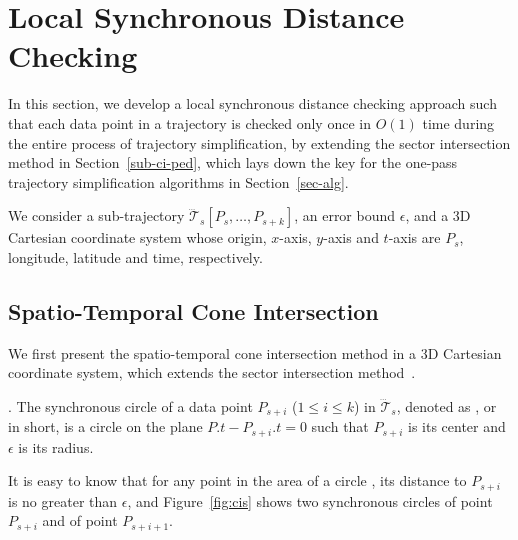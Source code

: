 \section{Local Synchronous Distance Checking}
\label{sec-localcheck}


In this section, we develop a local synchronous distance checking approach such that each data point in a trajectory is checked only once in $O(1)$ time during the entire process of trajectory simplification, by extending the sector intersection method in Section~\ref{sub-ci-ped}, which lays down the key for the one-pass trajectory simplification algorithms in Section~\ref{sec-alg}.

We consider a sub-trajectory $\dddot{\mathcal{T}}_s[P_s, \ldots, P_{s+k}]$, an error bound $\epsilon$, and a 3D Cartesian coordinate system whose origin, $x$-axis, $y$-axis and $t$-axis  are $P_s$, longitude, latitude and time, respectively.

\subsection{Spatio-Temporal Cone Intersection}

We first present the spatio-temporal cone intersection method in a 3D Cartesian coordinate system, which extends the sector intersection method~\cite{Williams:Longest, Sklansky:Cone, Zhao:Sleeve}. %





. The synchronous circle of a data point $P_{s+i}$ ($1\le i\le k$) in $\dddot{\mathcal{T}}_s$, denoted as , or  in short, is a circle on the plane $P.t-P_{s+i}.t = 0$ such that $P_{s+i}$ is its center and $\epsilon$ is its radius.


It is easy to know that for any point in the area of a circle , its distance to $P_{s+i}$ is no greater than $\epsilon$, and
Figure~\ref{fig:cis} shows two synchronous circles  of point $P_{s+i}$ and  of point $P_{s+i+1}$.

